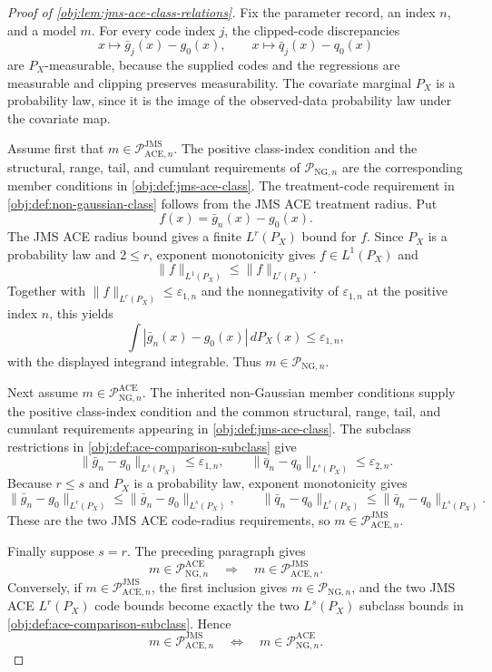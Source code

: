 \documentclass[11pt]{article}
\begin{document}
\begin{proof}[Proof of \cref{obj:lem:jms-ace-class-relations}]
Fix the parameter record, an index \(n\), and a model \(m\).  For every code index \(j\), the clipped-code discrepancies
\[
x\longmapsto \bar g_j(x)-g_0(x),
\qquad
x\longmapsto \bar q_j(x)-q_0(x)
\]
are \(P_X\)-measurable, because the supplied codes and the regressions are measurable and clipping preserves measurability.  The covariate marginal \(P_X\) is a probability law, since it is the image of the observed-data probability law under the covariate map. %

Assume first that \(m\in\mathcal P_{\mathrm{ACE},n}^{\mathrm{JMS}}\).  The positive class-index condition and the structural, range, tail, and cumulant requirements of \(\mathcal P_{\mathrm{NG},n}\) are the corresponding member conditions in \cref{obj:def:jms-ace-class}.  The treatment-code requirement in \cref{obj:def:non-gaussian-class} follows from the JMS ACE treatment radius.  Put
\[
f(x)=\bar g_n(x)-g_0(x).
\]
The JMS ACE radius bound gives a finite \(L^r(P_X)\) bound for \(f\).  Since \(P_X\) is a probability law and \(2\le r\), exponent monotonicity gives \(f\in L^1(P_X)\) and
\[
\|f\|_{L^1(P_X)}
\le
\|f\|_{L^r(P_X)} .
\]
Together with \(\|f\|_{L^r(P_X)}\le\varepsilon_{1,n}\) and the nonnegativity of \(\varepsilon_{1,n}\) at the positive index \(n\), this yields
\[
\int |\bar g_n(x)-g_0(x)|\,dP_X(x)\le \varepsilon_{1,n},
\]
with the displayed integrand integrable.  Thus \(m\in\mathcal P_{\mathrm{NG},n}\). %

Next assume \(m\in\mathcal P_{\mathrm{NG},n}^{\mathrm{ACE}}\).  The inherited non-Gaussian member conditions supply the positive class-index condition and the common structural, range, tail, and cumulant requirements appearing in \cref{obj:def:jms-ace-class}.  The subclass restrictions in \cref{obj:def:ace-comparison-subclass} give
\[
\|\bar g_n-g_0\|_{L^s(P_X)}\le\varepsilon_{1,n},
\qquad
\|\bar q_n-q_0\|_{L^s(P_X)}\le\varepsilon_{2,n}.
\]
Because \(r\le s\) and \(P_X\) is a probability law, exponent monotonicity gives
\[
\|\bar g_n-g_0\|_{L^r(P_X)}
\le
\|\bar g_n-g_0\|_{L^s(P_X)},
\qquad
\|\bar q_n-q_0\|_{L^r(P_X)}
\le
\|\bar q_n-q_0\|_{L^s(P_X)} .
\]
These are the two JMS ACE code-radius requirements, so
\(m\in\mathcal P_{\mathrm{ACE},n}^{\mathrm{JMS}}\). %

Finally suppose \(s=r\).  The preceding paragraph gives
\[
m\in\mathcal P_{\mathrm{NG},n}^{\mathrm{ACE}}
\quad\Longrightarrow\quad
m\in\mathcal P_{\mathrm{ACE},n}^{\mathrm{JMS}} .
\]
Conversely, if \(m\in\mathcal P_{\mathrm{ACE},n}^{\mathrm{JMS}}\), the first inclusion gives \(m\in\mathcal P_{\mathrm{NG},n}\), and the two JMS ACE \(L^r(P_X)\) code bounds become exactly the two \(L^s(P_X)\) subclass bounds in \cref{obj:def:ace-comparison-subclass}.  Hence
\[
m\in\mathcal P_{\mathrm{ACE},n}^{\mathrm{JMS}}
\quad\Longleftrightarrow\quad
m\in\mathcal P_{\mathrm{NG},n}^{\mathrm{ACE}} .
\]
\end{proof}
\end{document}
